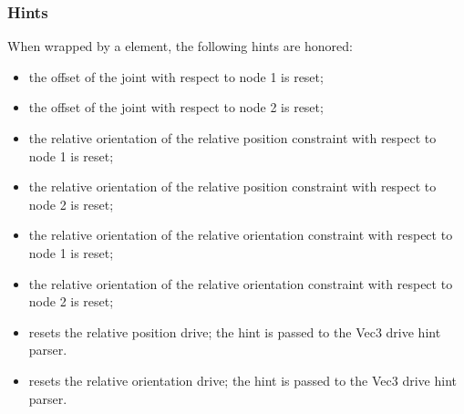 \subsubsection{Hints}
When wrapped by a  element, the following hints are honored:
\begin{itemize}
\item {} the offset of the joint
with respect to node 1 is reset;
\item {} the offset of the joint
with respect to node 2 is reset;
\item {} the relative orientation
of the relative position constraint with respect to node 1 is reset;
\item {} the relative orientation 
of the relative position constraint with respect to node 2 is reset;
\item {} the relative orientation
of the relative orientation constraint with respect to node 1 is reset;
\item {} the relative orientation 
of the relative orientation constraint with respect to node 2 is reset;
\item {} resets the relative position drive;
the hint is passed to the Vec3 drive hint parser.
\item {} resets the relative orientation drive;
the hint is passed to the Vec3 drive hint parser.
\end{itemize}



